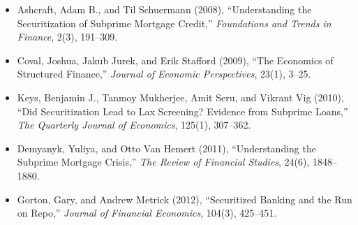 

\begin{itemize}

\item Ashcraft, Adam B., and Til Schuermann (2008),
``Understanding the Securitization of Subprime Mortgage Credit,''
\emph{Foundations and Trends in Finance}, 2(3), 191--309.

\item Coval, Joshua, Jakub Jurek, and Erik Stafford (2009),
``The Economics of Structured Finance,''
\emph{Journal of Economic Perspectives}, 23(1), 3--25.

\item Keys, Benjamin J., Tanmoy Mukherjee, Amit Seru, and Vikrant Vig (2010),
``Did Securitization Lead to Lax Screening? Evidence from Subprime Loans,''
\emph{The Quarterly Journal of Economics}, 125(1), 307--362.

\item Demyanyk, Yuliya, and Otto Van Hemert (2011),
``Understanding the Subprime Mortgage Crisis,''
\emph{The Review of Financial Studies}, 24(6), 1848--1880.

\item Gorton, Gary, and Andrew Metrick (2012),
``Securitized Banking and the Run on Repo,''
\emph{Journal of Financial Economics}, 104(3), 425--451.

\end{itemize}



